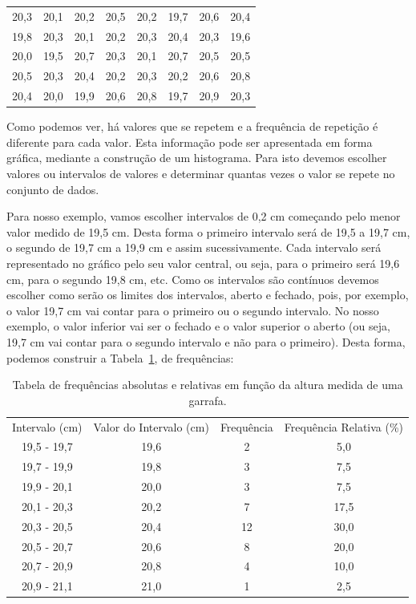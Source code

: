 \begin{center}
\hspace{-0.8cm}
  \begin{tabular}[m]{c c c c c c c c}
 20,3	 & 20,1 & 20,2 & 20,5 & 20,2 & 19,7 & 20,6 & 20,4\\
 19,8 & 20,3 & 20,1 & 20,2 & 20,3 & 20,4 & 20,3 & 19,6\\
 20,0 & 19,5 & 20,7 & 20,3 & 20,1 & 20,7 & 20,5 & 20,5\\
 20,5 & 20,3 & 20,4 & 20,2 & 20,3 & 20,2 & 20,6 & 20,8\\
 20,4 & 20,0 & 19,9 & 20,6 & 20,8 & 19,7 & 20,9 & 20,3\\
  \end{tabular}
\end{center}
\vspace{-0.3cm}

Como podemos ver, há valores que se repetem e a frequência de repetição é diferente para cada valor. Esta informação pode ser apresentada em forma gráfica, mediante a construção de um histograma. Para isto devemos escolher valores ou intervalos de valores e determinar quantas vezes o valor se repete no conjunto de dados.

Para nosso exemplo, vamos escolher intervalos de 0,2 cm começando pelo menor valor medido de 19,5 cm.  Desta forma o primeiro intervalo será de 19,5 a 19,7 cm, o segundo de 19,7 cm a 19,9 cm e assim sucessivamente.  Cada intervalo será representado no gráfico pelo seu valor central, ou seja, para o primeiro será 19,6 cm, para o segundo 19,8 cm, etc.  Como os intervalos são contínuos devemos escolher como serão os limites dos intervalos, aberto e fechado, pois, por exemplo, o valor 19,7 cm vai contar para o primeiro ou o segundo intervalo. No nosso exemplo, o valor inferior vai ser o fechado e o valor superior o aberto (ou seja, 19,7 cm vai contar para o segundo intervalo e não para o primeiro). Desta forma, podemos construir a Tabela~\ref{tab:freq}, de frequências:
\begin{table}
\begin{center}
\hspace{-0.8cm}
\caption{Tabela de frequências absolutas e relativas em função da altura medida de uma garrafa.}\label{tab:freq}
  \begin{tabular}[m]{|c| c| c| c|}
  Intervalo (cm) & Valor do Intervalo (cm)	& Frequência & Frequência Relativa (\%)  \\
19,5 - 19,7	&	19,6	&	2   & 5,0 \\
19,7 - 19,9	&	19,8	&	3   & 7,5\\
19,9 - 20,1 	&	20,0	&	3   & 7,5\\
20,1	- 20,3	&	20,2	&	7   & 17,5\\
20,3 - 20,5	&	20,4	&	12 & 30,0\\
20,5 - 20,7	&	20,6	&	8   & 20,0\\
20,7 - 20,9	&	20,8	&	4   & 10,0 \\
20,9	- 21,1	&	21,0	&	1   &  2,5\\ 	
  \end{tabular}
\end{center}
\end{table}
\vspace{0.3cm}

